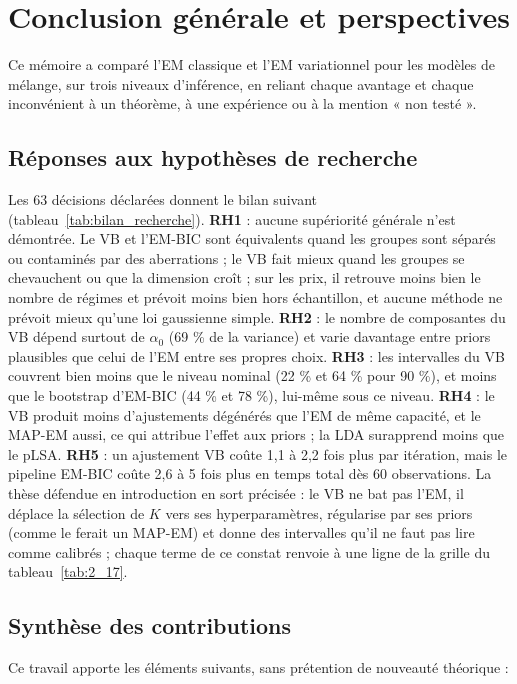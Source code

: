 \chapter*{Conclusion générale et perspectives}
Ce mémoire a comparé l'EM classique et l'EM variationnel pour les modèles de mélange, sur trois niveaux d'inférence, en reliant chaque avantage et chaque inconvénient à un théorème, à une expérience ou à la mention « non testé ».

\section*{Réponses aux hypothèses de recherche}
Les 63 décisions déclarées donnent le bilan suivant (tableau~\ref{tab:bilan_recherche}). \textbf{RH1} : aucune supériorité générale n'est démontrée. Le VB et l'EM-BIC sont équivalents quand les groupes sont séparés ou contaminés par des aberrations ; le VB fait mieux quand les groupes se chevauchent ou que la dimension croît ; sur les prix, il retrouve moins bien le nombre de régimes et prévoit moins bien hors échantillon, et aucune méthode ne prévoit mieux qu'une loi gaussienne simple. \textbf{RH2} : le nombre de composantes du VB dépend surtout de $\alpha_0$ (69 \% de la variance) et varie davantage entre priors plausibles que celui de l'EM entre ses propres choix. \textbf{RH3} : les intervalles du VB couvrent bien moins que le niveau nominal (22 \% et 64 \% pour 90 \%), et moins que le bootstrap d'EM-BIC (44 \% et 78 \%), lui-même sous ce niveau. \textbf{RH4} : le VB produit moins d'ajustements dégénérés que l'EM de même capacité, et le MAP-EM aussi, ce qui attribue l'effet aux priors ; la LDA surapprend moins que le pLSA. \textbf{RH5} : un ajustement VB coûte 1,1 à 2,2 fois plus par itération, mais le pipeline EM-BIC coûte 2,6 à 5 fois plus en temps total dès 60 observations. La thèse défendue en introduction en sort précisée : le VB ne bat pas l'EM, il déplace la sélection de $K$ vers ses hyperparamètres, régularise par ses priors (comme le ferait un MAP-EM) et donne des intervalles qu'il ne faut pas lire comme calibrés ; chaque terme de ce constat renvoie à une ligne de la grille du tableau~\ref{tab:2_17}.

\section*{Synthèse des contributions}
Ce travail apporte les éléments suivants, sans prétention de nouveauté théorique :

